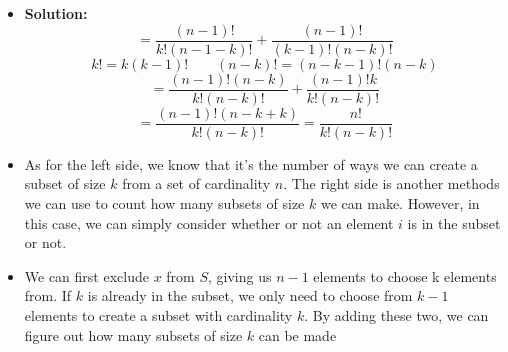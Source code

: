 \documentclass[hidelinks]{article}
\begin{document}
\begin{itemize}
    \begin{itemize}
        \item[ ] \textbf{Solution:}
        \[
         = \frac{(n-1)!}{k!(n-1-k)!} + \frac{(n-1)!}{(k-1)!(n - k)!}
        \]
        \[
            k! = k(k-1)! \quad \quad (n-k)! = (n - k - 1)!(n-k)
        \]
        \[
             = \frac{(n-1)!(n-k)}{k!(n-k)!} + \frac{(n-1)!k}{k!(n-k)!} 
        \]
        \[
            = \frac{(n-1)!(n - k + k)}{k!(n-k)!} = \frac{n!}{k!(n-k)!}
        \]
    \item[ ] As for the left side, we know that it's the number of ways we can create a subset of size $k$ from a set of cardinality $n$. The right side is another methods we can use to count how many subsets of size $k$ we can make. However, in this case, we can simply consider whether or not an element $i$ is in the subset or not.
    \item[ ] We can first exclude $x$ from $S$, giving us $n-1$ elements to choose k elements from. If $k$ is already in the subset, we only need to choose from $k-1$ elements to create a subset with cardinality $k$. By adding these two, we can figure out how many subsets of size $k$ can be made 
    \end{itemize}
\end{itemize}
\end{document}
